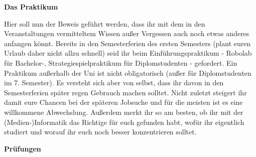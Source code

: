 

\textbf{Das Praktikum}

Hier soll nun der Beweis geführt werden, dass ihr mit dem in den Veranstaltungen vermitteltem Wissen außer Vergessen auch noch etwas anderes anfangen könnt.
Bereits in den Semesterferien des ersten Semesters (plant euren Urlaub daher nicht allzu schnell) seid ihr beim Einführungspraktikum - Robolab für Bachelor-, Strategiespielpraktikum für Diplomstudenten - gefordert.
Ein Praktikum außerhalb der Uni ist nicht obligatorisch (außer für Diplomstudenten im 7. Semester).
Es versteht sich aber von selbst, dass ihr davon in den Semesterferien später regen Gebrauch machen solltet.
Nicht zuletzt steigert ihr damit eure Chancen bei der späteren Jobsuche und für die meisten ist es eine willkommene Abwechslung.
Außerdem merkt ihr so am besten, ob ihr mit der (Medien-)Informatik das Richtige für euch gefunden habt, wofür ihr eigentlich studiert und worauf ihr euch noch besser konzentrieren solltet.

\textbf{Prüfungen}

